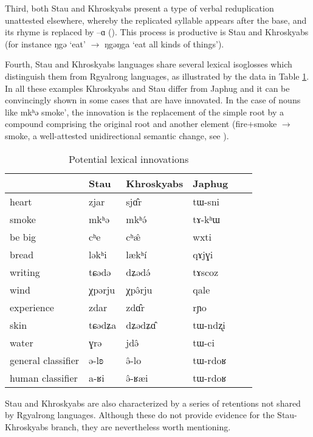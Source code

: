 \documentclass[oneside,a4paper,11pt]{article}
\newcommand{\ipa}[1]{{\phon #1}} %
\begin{document}
Third, both Stau and Khroskyabs present a type of verbal reduplication unattested elsewhere, whereby the replicated syllable appears after the base, and its rhyme is replaced by \ipa{--ɑ} (\citealt{lai13fuyin}). This process is productive is Stau and Khroskyabs (for instance \ipa{ŋgə} `eat' $\rightarrow$ \ipa{ŋgəŋga} `eat all kinds of things').
 
 
 Fourth, Stau and Khroskyabs languages share several lexical isoglosses which distinguish them from Rgyalrong languages, as illustrated by the data in Table \ref{tab:lexicon}. In all these examples Khroskyabs and Stau differ from Japhug and it can be convincingly shown in some cases that are have innovated. In the case of nouns like \ipa{mkʰə}  smoke', the innovation is the replacement of the simple root by a compound comprising the original root and another element (fire+smoke $\rightarrow$ smoke, a well-attested unidirectional semantic change, see \citealt{urban11semantic}).

  \begin{table}[h]
  \caption{Potential lexical innovations} \label{tab:lexicon} \centering
 \begin{tabular}{llllll}
 \toprule
 &	Stau &	Khroskyabs &	Japhug &	\\	
  \midrule
heart &	\ipa{zjar}  &	\ipa{sjɑ̂r} &	\ipa{tɯ-sni} &	\\	
smoke  &	\ipa{mkʰə} &	\ipa{mkʰə́} &	\ipa{tɤ-kʰɯ} &	\\	
be big  &	\ipa{cʰe} &	\ipa{cʰæ̂} &	\ipa{wxti} &	\\	
bread  &	\ipa{ləkʰi} &	\ipa{lækʰí} &	\ipa{qɤjɣi} &	\\	
writing  &	\ipa{tɕədə} &	\ipa{dʑədə́} &	\ipa{tɤscoz} &	\\	
wind  &	\ipa{χpərju} &	\ipa{χpə̂rju    } &	\ipa{qale} &	\\	
experience  &	\ipa{zdar} &	\ipa{zdɑ̂r} &	\ipa{rɲo} &	\\	
skin  &	\ipa{tɕədʑa} &	\ipa{dʑədʑɑ̂} &	\ipa{tɯ-ndʐi} &	\\	
water  &	\ipa{ɣrə} &	\ipa{jdə̂} &	\ipa{tɯ-ci} &	\\
general classifier  &	\ipa{ə-lʚ} &	\ipa{ə̂-lo} &	\ipa{tɯ-rdoʁ} &	\\	
human classifier  &	\ipa{a-ʁi} &	\ipa{ə̂-ʁæi} &	\ipa{tɯ-rdoʁ} &	\\	
\bottomrule
\end{tabular}
\end{table}

Stau and Khroskyabs are also characterized by a series of retentions not shared by Rgyalrong languages. Although these do not provide evidence for the Stau-Khroskyabs branch, they are nevertheless worth mentioning.
\end{document}
